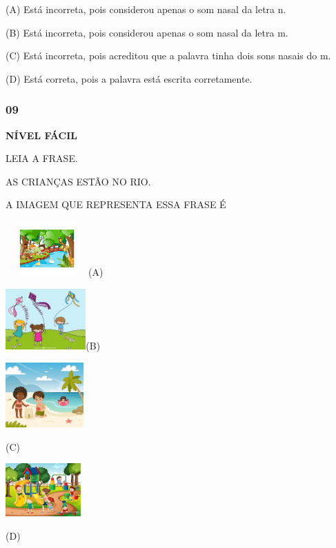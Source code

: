\protect\hypertarget{_Hlk129358521}{}{}(A) Está incorreta, pois
considerou apenas o som nasal da letra n.

(B) Está incorreta, pois considerou apenas o som nasal da letra m.

(C) Está incorreta, pois acreditou que a palavra tinha dois sons nasais
do m.

(D) Está correta, pois a palavra está escrita corretamente.

\subsubsection{09}\label{section-119}

\textbf{NÍVEL FÁCIL}

LEIA A FRASE.

AS CRIANÇAS ESTÃO NO RIO.

A IMAGEM QUE REPRESENTA ESSA FRASE É

\includegraphics[width=1.25000in,height=0.82361in]{media/image154.jpeg}(A)

\includegraphics[width=1.21181in,height=0.92014in]{media/image155.jpeg}(B)

\includegraphics[width=1.18125in,height=0.98472in]{media/image156.jpeg}

(C)

\includegraphics[width=1.13611in,height=0.80208in]{media/image157.jpeg}

(D)

